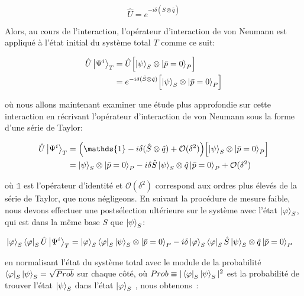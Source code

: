 \begin{onehalfspace}
    \begin{equation}
        \hat{U} = e^{-i\delta(\hat{S} \otimes \hat{q})}
    \end{equation}

    \noindent Alors, au cours de l'interaction, 
    l’opérateur d’interaction de von Neumann est appliqué à 
    l’état initial du système total $T$ comme ce suit: 

    \begin{align}
        \hat{U}\ket{\Psi^{i}}_T &= \hat{U}\Bigl[ \ket{\psi}_S \otimes \ket{\bar{p} = 0}_P \Bigr]\\
        &= e^{-i\delta(\hat{S} \otimes \hat{q})}\Bigl[ \ket{\psi}_S \otimes \ket{\bar{p} = 0}_P \Bigr]
    \end{align}

    \noindent où nous allons maintenant examiner une étude plus approfondie
    sur cette interaction en récrivant l’opérateur d’interaction de von Neumann
    sous la forme d'une série de Taylor: 

    \begin{align}
        \hat{U}\ket{\Psi^{i}}_T &= \Bigl(\mathds{1} - i\delta(\hat{S} \otimes \hat{q}) + \mathcal{O}(\delta^2) \Bigr)\Bigl[ \ket{\psi}_S \otimes \ket{\bar{p} = 0}_P \Bigr]\\
        &=  \ket{\psi}_S \otimes \ket{\bar{p} = 0}_P - i\delta\hat{S}\ket{\psi}_S\otimes\hat{q}\ket{\bar{p} = 0}_P + \mathcal{O}(\delta^2)
    \end{align}

    \noindent où $\mathds{1}$ est l'opérateur d'identité et 
    $\mathcal{O}(\delta^2)$ correspond aux ordres plus 
    élevés de la série de Taylor, que nous négligeons. En suivant la 
    procédure de mesure faible, nous devons effectuer une postsélection 
    ultérieure sur le système avec l’état $\ket{\varphi}_S$, qui est dans 
    la même base $S$ que $\ket{\psi}_S$:

    \begin{align}
        \ket{\varphi}_S\bra{\varphi}_S\hat{U}\ket{\Psi^{i}}_T &= \ket{\varphi}_S\bra{\varphi}_S\ket{\psi}_S \otimes \ket{\bar{p} = 0}_P - i\delta\ket{\varphi}_S\bra{\varphi}_S\hat{S}\ket{\psi}_S\otimes\hat{q}\ket{\bar{p} = 0}_P
    \end{align}

    \noindent en normalisant l’état du système total avec le module de la 
    probabilité $\bra{\varphi}_S\ket{\psi}_S =\sqrt{Prob}$ sur chaque côté, où
    $Prob\equiv |\bra{\varphi}_S\ket{\psi}_S|^2$ est la probabilité de trouver l’état $\ket{\psi}_S$
    dans l’état $\ket{\varphi}_S$ \cite{Lundeen_Resch,Lundeen_thesis, Steinberg_prob_div},
    nous obtenons :


\end{onehalfspace}
